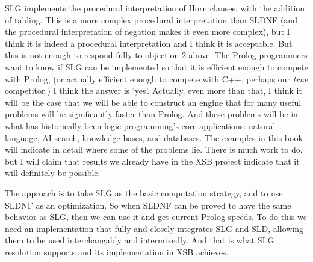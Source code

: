 SLG implements the procedural interpretation of Horn clauses, with the
addition of tabling.  This is a more complex procedural interpretation
than SLDNF (and the procedural interpretation of negation makes it
even more complex), but I think it is indeed a procedural
interpretation and I think it is acceptable.  But this is not enough
to respond fully to objection 2 above.  The Prolog programmers want to
know if SLG can be implemented so that it is efficient enough to
compete with Prolog, (or actually efficient enough to compete with
C++, perhaps our {\em true} competitor.)  I think the answer is `yes'.
Actually, even more than that, I think it will be the case that we
will be able to construct an engine that for many useful problems will
be significantly faster than Prolog.  And these problems will be in
what has historically been logic programming's core applications:
natural language, AI search, knowledge bases, and databases.
The examples in this book
will indicate in detail where some of the problems lie.  There is much
work to do, but I will claim that results we already have in the XSB
project indicate that it will definitely be possible.

The approach is to take SLG as the basic computation strategy, and to
use SLDNF as an optimization.  So when SLDNF can be proved to have the
same behavior as SLG, then we can use it and get current Prolog
speeds.  To do this we need an implementation that fully and closely
integrates SLG and SLD, allowing them to be used interchangably and
intermixedly.  And that is what SLG resolution supports and its
implementation in XSB achieves.

